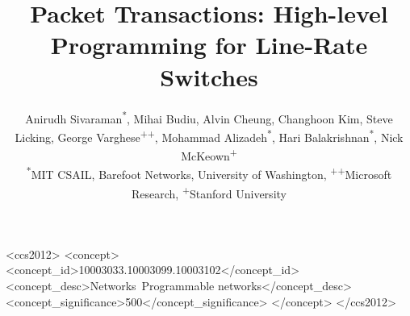 \documentclass[10pt]{sig-alternate-05-2015}
\begin{document}


\date{}

\title{Packet Transactions: High-level Programming for Line-Rate Switches}
\author{
\alignauthor \fontsize{10.7}{9.9}\selectfont Anirudh Sivaraman\textsuperscript{*}, Mihai Budiu\textsuperscript{\dag}, Alvin Cheung\textsuperscript{\ddag}, Changhoon Kim\textsuperscript{\dag}, Steve Licking\textsuperscript{\dag}, \fontsize{10.7}{9.9}\selectfont George Varghese\textsuperscript{++}, Mohammad Alizadeh\textsuperscript{*}, Hari Balakrishnan\textsuperscript{*}, Nick McKeown\textsuperscript{+}\\
\affaddr \fontsize{10.7}{9.9}\selectfont \textsuperscript{*}MIT CSAIL, \textsuperscript{\dag}Barefoot Networks, \textsuperscript{\ddag}University of Washington, \textsuperscript{++}Microsoft Research, \textsuperscript{+}Stanford University
}

\maketitle



\begin{CCSXML}
<ccs2012>
<concept>
<concept_id>10003033.10003099.10003102</concept_id>
<concept_desc>Networks~Programmable networks</concept_desc>
<concept_significance>500</concept_significance>
</concept>
</ccs2012>
\end{CCSXML}


\printccsdesc












\balance
{\small 
}

%
\end{document}
